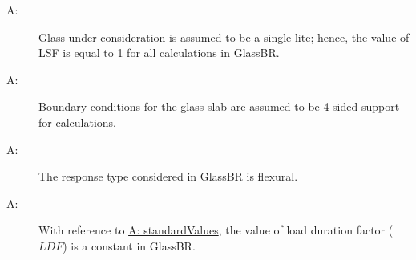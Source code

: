 \documentclass[12pt]{article}
\newcounter{assumpnum}
\newcommand{\atheassumpnum}{A\theassumpnum}
\begin{document}
\begin{description}
\item[\atheassumpnum\label{A:glassLite}:]Glass under consideration is assumed to be a single lite; hence, the value of LSF is equal to 1 for all calculations in GlassBR.
\end{description}
\begin{description}
\item[\atheassumpnum\label{A:boundaryConditions}:]Boundary conditions for the glass slab are assumed to be 4-sided support for calculations.
\end{description}
\begin{description}
\item[\atheassumpnum\label{A:responseType}:]The response type considered in GlassBR is flexural.
\end{description}
\begin{description}
\item[\atheassumpnum\label{A:ldfConstant}:]With reference to \hyperref[A:standardValues]{A: standardValues}, the value of load duration factor ($LDF$) is a constant in GlassBR.
\end{description}
\end{document}
